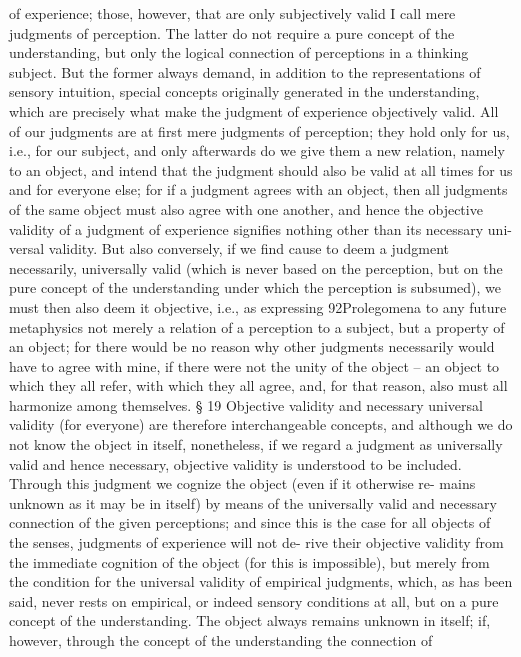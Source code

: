 of experience; those, however, that are only subjectively valid I call mere
judgments of perception. The latter do not require a pure concept
of the understanding, but only the logical connection of perceptions in
a thinking subject. But the former always demand, in addition to the
representations of sensory intuition, special concepts originally generated
in the understanding, which are precisely what make the judgment of
experience objectively valid.
All of our judgments are at ﬁrst mere judgments of perception; they
hold only for us, i.e., for our subject, and only afterwards do we give
them a new relation, namely to an object, and intend that the judgment
should also be valid at all times for us and for everyone else; for if a
judgment agrees with an object, then all judgments of the same object
must also agree with one another, and hence the objective validity of a
judgment of experience signiﬁes nothing other than its necessary uni-
versal validity. But also conversely, if we ﬁnd cause to deem a judgment
necessarily, universally valid (which is never based on the perception, but
on the pure concept of the understanding under which the perception
is subsumed), we must then also deem it objective, i.e., as expressing
92Prolegomena to any future metaphysics
not merely a relation of a perception to a subject, but a property of an
object; for there would be no reason why other judgments necessarily
would have to agree with mine, if there were not the unity of the object –
an object to which they all refer, with which they all agree, and, for that
reason, also must all harmonize among themselves.
§ 19
Objective validity and necessary universal validity (for everyone) are
therefore interchangeable concepts, and although we do not know the
object in itself, nonetheless, if we regard a judgment as universally valid
and hence necessary, objective validity is understood to be included.
Through this judgment we cognize the object (even if it otherwise re-
mains unknown as it may be in itself) by means of the universally valid
and necessary connection of the given perceptions; and since this is the
case for all objects of the senses, judgments of experience will not de-
rive their objective validity from the immediate cognition of the object
(for this is impossible), but merely from the condition for the universal
validity of empirical judgments, which, as has been said, never rests on
empirical, or indeed sensory conditions at all, but on a pure concept
of the understanding. The object always remains unknown in itself; if,
however, through the concept of the understanding the connection of

